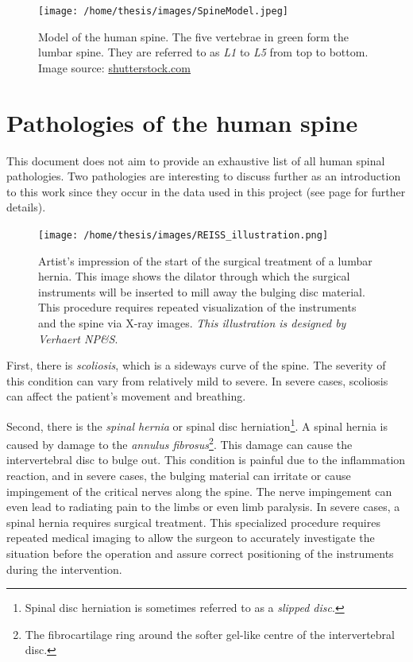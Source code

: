\begin{figure}
    \centering
    \texttt{[image: /home/thesis/images/SpineModel.jpeg]}
    \caption{\label{fig:spineimage}Model of the human spine. The five vertebrae in green form the lumbar spine. They are referred to as \textit{L1} to \textit{L5} from top to bottom. Image source: \url{shutterstock.com}}
\end{figure}

\section{Pathologies of the human spine}
\par{
    This document does not aim to provide an exhaustive list of all human spinal pathologies. 
    Two pathologies are interesting to discuss further as an introduction to this work since they occur in the data used in this project (see page \pageref{sec:datasets} for further details).
}
\begin{figure}
    \centering
    \texttt{[image: /home/thesis/images/REISS\_illustration.png]}
    \caption{Artist's impression of the start of the surgical treatment of a lumbar hernia. 
    This image shows the dilator through which the surgical instruments will be inserted to mill away the bulging disc material.
    This procedure requires repeated visualization of the instruments and the spine via X-ray images. \textit{This illustration is designed by Verhaert NP\&S}.\label{fig:REISS_procedure}}
\end{figure}
\par{
    First, there is \textit{scoliosis}, which is a sideways curve of the spine.
    The severity of this condition can vary from relatively mild to severe. 
    In severe cases, scoliosis can affect the patient's movement and breathing.
}
\par{
    Second, there is the \textit{spinal hernia} or spinal disc herniation\footnote{Spinal disc herniation is sometimes referred to as a \textit{slipped disc}.}. 
    A spinal hernia is caused by damage to the \textit{annulus fibrosus}\footnote{The fibrocartilage ring around the softer gel-like centre of the intervertebral disc.}. 
    This damage can cause the intervertebral disc to bulge out. 
    This condition is painful due to the inflammation reaction, and in severe cases, the bulging material can irritate or cause impingement of the critical nerves along the spine.
    The nerve impingement can even lead to radiating pain to the limbs or even limb paralysis.
    In severe cases, a spinal hernia requires surgical treatment.
    This specialized procedure requires repeated medical imaging to allow the surgeon to accurately investigate the situation before the operation and assure correct positioning of the instruments during the intervention.
}
